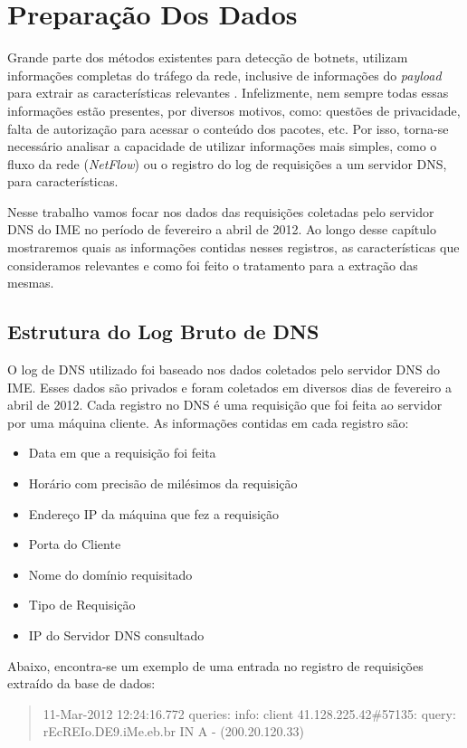 \chapter{Preparação Dos Dados}
Grande parte dos métodos existentes para detecção de botnets, utilizam informações completas do tráfego da rede, inclusive de informações do \textit{payload} para extrair as características relevantes \citep{krmicek2011inspecting}. Infelizmente, nem sempre todas essas informações estão presentes, por diversos motivos, como: questões de privacidade, falta de autorização para acessar o conteúdo dos pacotes, etc. Por isso, torna-se necessário analisar a capacidade de utilizar informações mais simples, como o fluxo da rede (\textit{NetFlow}) ou o registro do log de requisições a um servidor DNS, para características.

Nesse trabalho vamos focar nos dados das requisições coletadas pelo servidor DNS do IME no período de fevereiro a abril de 2012. Ao longo desse capítulo mostraremos quais as informações contidas nesses registros, as características que consideramos relevantes e como foi feito o tratamento para a extração das mesmas.

\section{Estrutura do Log Bruto de DNS }
O log de DNS utilizado foi baseado nos dados coletados pelo servidor DNS do IME. Esses dados são privados e foram coletados em diversos dias de fevereiro a abril de 2012. Cada registro no DNS é uma requisição que foi feita ao servidor por uma máquina cliente. As informações contidas em cada registro são:

\begin{itemize}
\item Data em que a requisição foi feita
\item Horário com precisão de milésimos da requisição
\item Endereço IP da máquina que fez a requisição
\item Porta do Cliente
\item Nome do domínio requisitado
\item Tipo de Requisição
\item IP do Servidor DNS consultado
\end{itemize}

Abaixo, encontra-se um exemplo de uma entrada no registro de requisições extraído da base de dados: 

\begin{quote}
11-Mar-2012 12:24:16.772 queries: info: client 41.128.225.42\#57135: query: rEcREIo.DE9.iMe.eb.br IN A - (200.20.120.33)
\end{quote}

